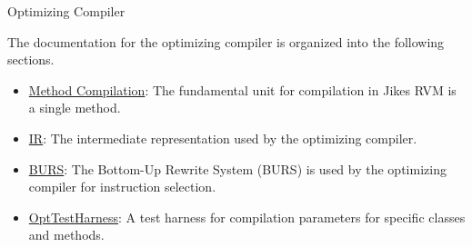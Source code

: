 \begin{section}{Optimizing Compiler}
\label{sec:optimizingcompiler}

The documentation for the optimizing compiler is organized into the following sections.

\begin{itemize}
  \item \hyperref[subsec:methodcompilation]{Method Compilation}: The fundamental unit for compilation in Jikes RVM is a single method.
  \item \hyperref[subsec:ir]{IR}: The intermediate representation used by the optimizing compiler.
  \item \hyperref[subsec:burs]{BURS}: The Bottom-Up Rewrite System (BURS) is used by the optimizing compiler for instruction selection.
  \item \hyperref[subsec:opttestharness]{OptTestHarness}: A test harness for compilation parameters for specific classes and methods.
\end{itemize}

\end{section}
